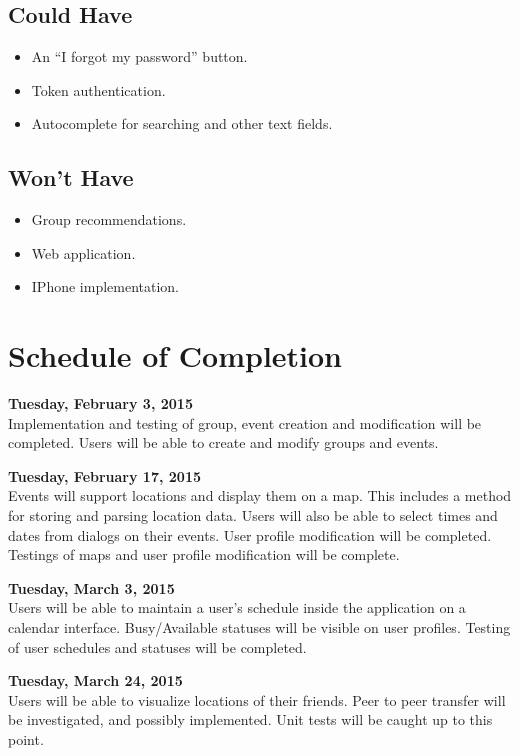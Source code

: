 \documentclass[11pt]{article}
\begin{document}
\subsection{Could Have}
\begin{itemize}
\item An ``I forgot my password'' button.
\item Token authentication.
\item Autocomplete for searching and other text fields.
\end{itemize}
\subsection{Won't Have}
\begin{itemize}
\item Group recommendations.
\item Web application.
\item IPhone implementation.
\end{itemize}
\newpage
\section{Schedule of Completion}

\textbf{Tuesday, February 3, 2015}
\\
Implementation and testing of group, event creation and modification will be completed.
Users will be able to create and modify groups and events.

\textbf{Tuesday, February 17, 2015}
\\  
Events will support locations and display them on a map. This includes a 
method for storing and parsing location data. Users will also be able to select
times and dates from dialogs on their events. User profile modification 
will be completed. Testings of maps and user profile modification will be 
complete.

\textbf{Tuesday, March 3, 2015}
\\	
Users will be able to maintain a user's schedule inside the application on
a calendar interface. Busy/Available statuses will be visible on user profiles.
Testing of user schedules and statuses will be completed.

\textbf{Tuesday, March 24, 2015}
\\
Users will be able to visualize locations of their friends. Peer to peer transfer will be
investigated, and possibly implemented. Unit tests will be caught up to this point.
 
\end{document}
